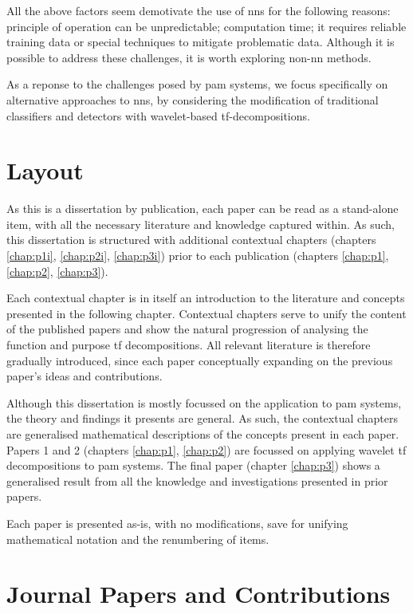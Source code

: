 All the above factors seem demotivate the use of \acp{nn} for the following reasons: principle of operation can be unpredictable; computation time; it requires reliable training data or special techniques to mitigate problematic data. Although it is possible to address these challenges, it is worth exploring non-\ac{nn} methods. 

As a reponse to the challenges posed by \ac{pam} systems, we focus specifically on alternative approaches to \acp{nn}, by considering the modification of traditional classifiers and detectors with wavelet-based \ac{tf}-decompositions.

\section{Layout}

As this is a dissertation by publication, each paper can be read as a stand-alone item, with all the necessary literature and knowledge captured within. As such, this dissertation is structured with additional contextual chapters (chapters \ref*{chap:p1i}, \ref*{chap:p2i}, \ref*{chap:p3i}) prior to each publication (chapters \ref*{chap:p1}, \ref*{chap:p2}, \ref*{chap:p3}).

Each contextual chapter is in itself an introduction to the literature and concepts presented in the following chapter. Contextual chapters serve to unify the content of the published papers and show the natural progression of analysing the function and purpose \ac{tf} decompositions. All relevant literature is therefore gradually introduced, since each paper conceptually expanding on the previous paper's ideas and contributions.

Although this dissertation is mostly focussed on the application to \ac{pam} systems, the theory and findings it presents are general. As such, the contextual chapters are generalised mathematical descriptions of the concepts present in each paper. Papers 1 and 2 (chapters \ref*{chap:p1}, \ref*{chap:p2}) are focussed on applying wavelet \ac{tf} decompositions to \ac{pam} systems. The final paper (chapter \ref*{chap:p3}) shows a generalised result from all the knowledge and investigations presented in prior papers.

Each paper is presented as-is, with no modifications, save for unifying mathematical notation and the renumbering of items.


\section{Journal Papers and Contributions}

